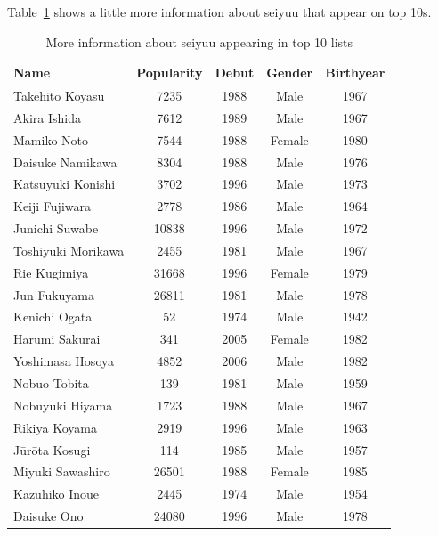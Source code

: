 Table~\ref{tab:moreInfoSeiyuu} shows a little more information about seiyuu that appear on top 10s.
\begin{table}[!hbt]
	\begin{center}
	\caption{More information about seiyuu appearing in top 10 lists}
	\label{tab:moreInfoSeiyuu}
	\begin{tabular}{|l|c|c|c|c|}
		\hline
		Name & Popularity & Debut & Gender & Birthyear \\
		\hline
		Takehito Koyasu & 7235 & 1988 & Male & 1967 \\
		\hline
		Akira Ishida & 7612 & 1989 & Male & 1967 \\
		\hline
		Mamiko Noto & 7544 & 1988 & Female & 1980 \\
		\hline
		Daisuke Namikawa & 8304 & 1988 & Male & 1976 \\
		\hline
		Katsuyuki Konishi & 3702 & 1996 & Male & 1973 \\
		\hline
		Keiji Fujiwara & 2778 & 1986 & Male & 1964 \\
		\hline
		Junichi Suwabe & 10838 & 1996 & Male & 1972 \\
		\hline
		Toshiyuki Morikawa & 2455 & 1981 & Male & 1967 \\
		\hline
		Rie Kugimiya & 31668 & 1996 & Female & 1979 \\
		\hline
		Jun Fukuyama & 26811 & 1981 & Male & 1978 \\
		\hline
		Kenichi Ogata & 52 & 1974 & Male & 1942 \\
		\hline
		Harumi Sakurai & 341 & 2005 & Female & 1982 \\
		\hline
		Yoshimasa Hosoya & 4852 & 2006 & Male & 1982 \\
		\hline
		Nobuo Tobita & 139 & 1981 & Male & 1959 \\
		\hline
		Nobuyuki Hiyama & 1723 & 1988 & Male & 1967 \\
		\hline
		Rikiya Koyama & 2919 & 1996 & Male & 1963 \\
		\hline
		Jūrōta Kosugi & 114 & 1985 & Male & 1957 \\
		\hline
		Miyuki Sawashiro & 26501 & 1988 & Female & 1985 \\
		\hline
		Kazuhiko Inoue & 2445 & 1974 & Male & 1954 \\
		\hline
		Daisuke Ono & 24080 & 1996 & Male & 1978 \\
		\hline
	\end{tabular}
	\end{center}
\end{table}

